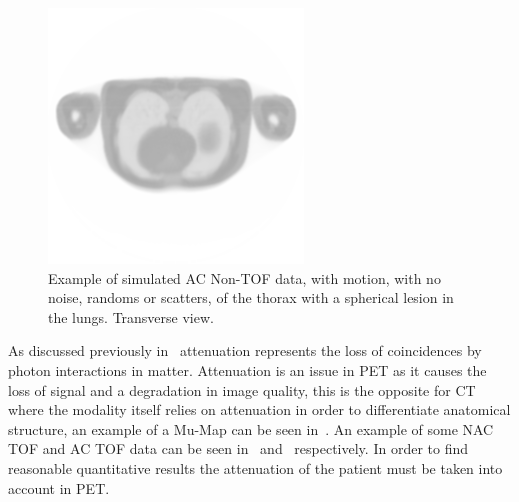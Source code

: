                 \begin{figure} %
                    \centering
                    
                    \includegraphics[width=1.0\linewidth]{figures/background_ac_example.png}
                    
                    \captionsetup{singlelinecheck=false, justification=raggedright}
                    \caption{Example of simulated \gls{AC} \gls{Non-TOF} data, with motion, with no noise, randoms or scatters, of the thorax with a spherical lesion in the lungs. Transverse view.} \label{fig:combined_pet_ct_ac_tof_example}
                \end{figure}
                
                As discussed previously in~ attenuation represents the loss of coincidences by photon interactions in matter. Attenuation is an issue in \gls{PET} as it causes the loss of signal and a degradation in image quality, this is the opposite for \gls{CT} where the modality itself relies on attenuation in order to differentiate anatomical structure, an example of a \gls{Mu-Map} can be seen in~. An example of some \gls{NAC} \gls{TOF} and \gls{AC} \gls{TOF} data can be seen in~ and~ respectively. In order to find reasonable quantitative results the attenuation of the patient must be taken into account in \gls{PET}. %
                
